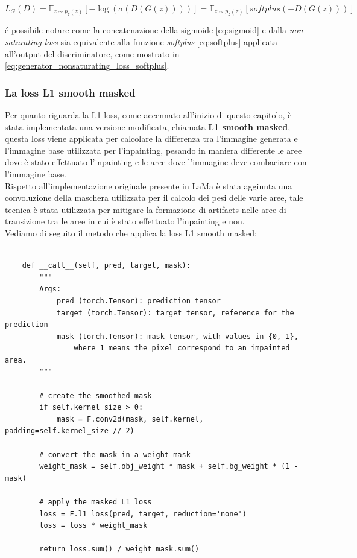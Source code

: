 \begin{equation}
    L_{G}(D) = \mathbb{E}_{z \sim p_{z}(z)}[ - \log(\sigma(D(G(z))))] = \mathbb{E}_{z \sim p_{z}(z)}[softplus(-D(G(z)))]
    \label{eq:generator_nonsaturating_loss_softplus}
\end{equation}

é possibile notare come la concatenazione della sigmoide \ref{eq:sigmoid} e dalla \textit{non saturating loss} sia equivalente alla 
funzione \textit{softplus} \ref{eq:softplus} applicata all'output del discriminatore, come mostrato in \ref{eq:generator_nonsaturating_loss_softplus}.

\subsubsection{La loss L1 smooth masked}
Per quanto riguarda la L1 loss, come accennato all'inizio di questo capitolo, è stata implementata una versione modificata,
chiamata \textbf{L1 smooth masked}, questa loss viene applicata per calcolare la differenza tra l'immagine generata e l'immagine base
utilizzata per l'inpainting, pesando in maniera differente le aree dove è stato effettuato l'inpainting e le aree 
dove l'immagine deve combaciare con l'immagine base.\\
Rispetto all'implementazione originale presente in LaMa è stata aggiunta una convoluzione della maschera utilizzata per il calcolo dei pesi delle
varie aree, tale tecnica è stata utilizzata per mitigare la formazione di artifacts nelle aree di transizione tra le aree in cui è stato effettuato l'inpainting e non.\\
Vediamo di seguito il metodo che applica la loss L1 smooth masked:

\begin{verbatim}

    def __call__(self, pred, target, mask):
        """
        Args:
            pred (torch.Tensor): prediction tensor
            target (torch.Tensor): target tensor, reference for the prediction
            mask (torch.Tensor): mask tensor, with values in {0, 1}, 
                where 1 means the pixel correspond to an impainted area.
        """

        # create the smoothed mask
        if self.kernel_size > 0:
            mask = F.conv2d(mask, self.kernel, padding=self.kernel_size // 2)

        # convert the mask in a weight mask
        weight_mask = self.obj_weight * mask + self.bg_weight * (1 - mask)

        # apply the masked L1 loss
        loss = F.l1_loss(pred, target, reduction='none')
        loss = loss * weight_mask

        return loss.sum() / weight_mask.sum()
\end{verbatim}

